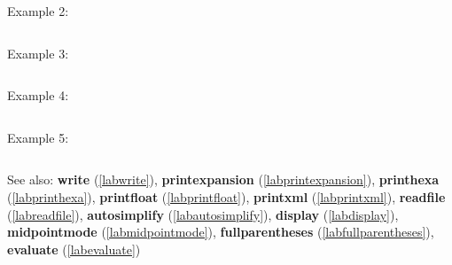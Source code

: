 \noindent Example 2: 
\begin{center}\begin{minipage}{15cm}\begin{Verbatim}[frame=single]
\end{Verbatim}
\end{minipage}\end{center}
\noindent Example 3: 
\begin{center}\begin{minipage}{15cm}\begin{Verbatim}[frame=single]
\end{Verbatim}
\end{minipage}\end{center}
\noindent Example 4: 
\begin{center}\begin{minipage}{15cm}\begin{Verbatim}[frame=single]
\end{Verbatim}
\end{minipage}\end{center}
\noindent Example 5: 
\begin{center}\begin{minipage}{15cm}\begin{Verbatim}[frame=single]
\end{Verbatim}
\end{minipage}\end{center}
See also: \textbf{write} (\ref{labwrite}), \textbf{printexpansion} (\ref{labprintexpansion}), \textbf{printhexa} (\ref{labprinthexa}), \textbf{printfloat} (\ref{labprintfloat}), \textbf{printxml} (\ref{labprintxml}), \textbf{readfile} (\ref{labreadfile}), \textbf{autosimplify} (\ref{labautosimplify}), \textbf{display} (\ref{labdisplay}), \textbf{midpointmode} (\ref{labmidpointmode}), \textbf{fullparentheses} (\ref{labfullparentheses}), \textbf{evaluate} (\ref{labevaluate})

